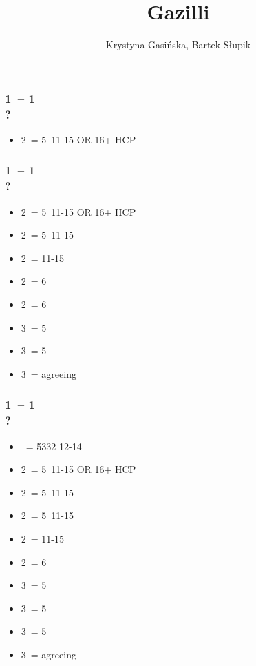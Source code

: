 \documentclass[12pt, a4paper]{article}
\title{Gazilli}
\author{Krystyna Gasińska, Bartek Słupik}
\begin{document}
\maketitle


\subsubsection*{1\hearts\ -- 1\spades\ \\ ?}
\begin{itemize}
    \item 2\clubs\ = 5\clubs\ 11-15 OR 16+ HCP \fonce
\end{itemize}

\subsubsection*{1\hearts\ -- 1\ntx\ \\ ?}
\begin{itemize}
    \item 2\clubs\ = 5\hearts\clubs\ 11-15 OR 16+ HCP \fonce
    \item 2\diams\ = 5\diams\ 11-15
    \item 2\hearts\ = 11-15
    \item 2\spades\ = 6\spades\ \gf
    \item 2\ntx\ = 6\minor\ \gf
    \item 3\clubs\ = 5\clubs\ \gf
    \item 3\diams\ = 5\diams\ \gf
    \item 3\hearts\ = agreeing \hearts\ \gf
\end{itemize}

\subsubsection*{1\spades\ -- 1\ntx\ \\ ?}
\begin{itemize}
    \item \pass\ = 5332 12-14
    \item 2\clubs\ = 5\spades\clubs\ 11-15 OR 16+ HCP \fonce
    \item 2\diams\ = 5\diams\ 11-15
    \item 2\hearts\ = 5\hearts\ 11-15
    \item 2\spades\ = 11-15
    \item 2\ntx\ = 6\minor\ \gf
    \item 3\clubs\ = 5\clubs\ \gf
    \item 3\diams\ = 5\diams\ \gf
    \item 3\hearts\ = 5\hearts\ \gf
    \item 3\spades\ = agreeing \spades\ \gf
\end{itemize}
\end{document}
